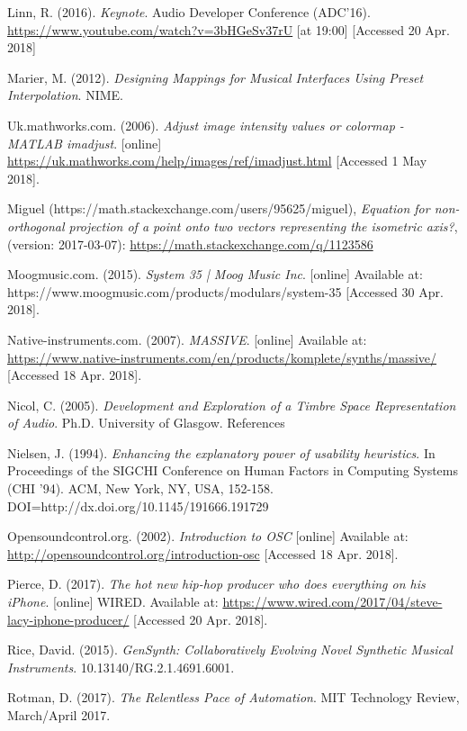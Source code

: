 \documentclass[11pt, oneside]{report}   	%
\begin{document}
{\begin{thebibliography}{9}
Linn, R. (2016). \emph{Keynote}.  Audio Developer Conference (ADC'16). \url{https://www.youtube.com/watch?v=3bHGeSv37rU} [at 19:00] [Accessed 20 Apr. 2018]

Marier, M. (2012). \emph{Designing Mappings for Musical Interfaces Using Preset Interpolation}. NIME.

Uk.mathworks.com. (2006). \emph{Adjust image intensity values or colormap - MATLAB imadjust}. [online] \url{https://uk.mathworks.com/help/images/ref/imadjust.html} [Accessed 1 May 2018].

Miguel (https://math.stackexchange.com/users/95625/miguel), \emph{Equation for non-orthogonal projection of a point onto two vectors representing the isometric axis?}, (version: 2017-03-07): \url{https://math.stackexchange.com/q/1123586}

Moogmusic.com. (2015). \emph{System 35 | Moog Music Inc}. [online] Available at: https://www.moogmusic.com/products/modulars/system-35 [Accessed 30 Apr. 2018].

Native-instruments.com. (2007). \emph{MASSIVE}. [online] Available at: \url{https://www.native-instruments.com/en/products/komplete/synths/massive/} [Accessed 18 Apr. 2018].

Nicol, C. (2005). \emph{Development and Exploration of a Timbre Space Representation of Audio}. Ph.D. University of Glasgow.
References

Nielsen, J. (1994). \emph{Enhancing the explanatory power of usability heuristics}. In Proceedings of the SIGCHI Conference on Human Factors in Computing Systems (CHI '94). ACM, New York, NY, USA, 152-158. DOI=http://dx.doi.org/10.1145/191666.191729

Opensoundcontrol.org. (2002). \emph{Introduction to OSC} [online] Available at: \url{http://opensoundcontrol.org/introduction-osc} [Accessed 18 Apr. 2018].

Pierce, D. (2017). \emph{The hot new hip-hop producer who does everything on his iPhone}. [online] WIRED. Available at: \url{https://www.wired.com/2017/04/steve-lacy-iphone-producer/} [Accessed 20 Apr. 2018].

Rice, David. (2015). \emph{GenSynth: Collaboratively Evolving Novel Synthetic Musical Instruments}. 10.13140/RG.2.1.4691.6001. 

Rotman, D. (2017). \emph{The Relentless Pace of Automation}. MIT Technology Review, March/April 2017.


\end{thebibliography}}
\end{document}
